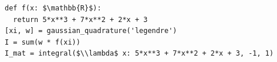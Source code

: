 \documentclass[border=10pt]{standalone}
\begin{document}
\begin{lstlisting}
def f(x: $\mathbb{R}$):
  return 5*x**3 + 7*x**2 + 2*x + 3
[xi, w] = gaussian_quadrature('legendre')
I = sum(w * f(xi))
I_mat = integral($\\lambda$ x: 5*x**3 + 7*x**2 + 2*x + 3, -1, 1)
\end{lstlisting}
\end{document}
